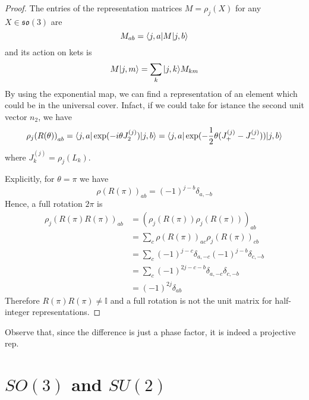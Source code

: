     \begin{proof}
        The entries of the representation matrices $M = \rho_j (X)$ for any $X \in \mathfrak{so}(3)$ are 
        \begin{equation*}
            M_{ab} = \langle j, a\vert M \vert j, b\rangle
        \end{equation*} 
        and its action on kets is
        \begin{equation*}
            M \vert j, m\rangle = \sum_k \vert j, k\rangle M_{km}
        \end{equation*}
        By using the exponential map, we can find a representation of an element which could be in the universal cover. Infact, if we could take for istance the second unit vector $n_2$, we have 
        \begin{equation*}
            \rho_j {(R(\theta))}_{ab} = \langle j, a\vert \exp(- i \theta J_2^{(j)}) \vert j, b\rangle = \langle j, a\vert \exp(-\frac{1}{2} \theta (J_+^{(j)} - J_-^{(j)})) \vert j, b\rangle
        \end{equation*}
        where $J_k^{(j)} = \rho_j (L_k)$. 
    
        Explicitly, for $\theta = \pi$ we have 
        \begin{equation*}
            \rho(R(\pi))_{ab} = (-1)^{j-b} \delta_{a, -b}
        \end{equation*}
        Hence, a full rotation $2\pi$ is 
        \begin{equation*}
        \begin{aligned}
            \rho_j{(R(\pi) R(\pi))}_{ab} & = {(\rho_j(R(\pi)) \rho_j(R(\pi)))}_{ab} \\ & = \sum_c \rho{(R(\pi))}_{ac} \rho_j{(R(\pi))}_{cb} \\ & = \sum_c (-1)^{j-c} \delta_{a, -c} {(-1)}^{j-b} \delta_{c, -b} \\ & = \sum_c (-1)^{2j -c-b} \delta_{a,-c} \delta_{c, -b} \\ & = {(-1)}^{2j} \delta_{ab}
        \end{aligned}
        \end{equation*}
        Therefore $R(\pi) R(\pi) \neq \mathbb I$ and a full rotation is not the unit matrix for half-integer representations. 
    \end{proof}
    
    Observe that, since the difference is just a phase factor, it is indeed a projective rep.

\section{$SO(3)$ and $SU(2)$}

